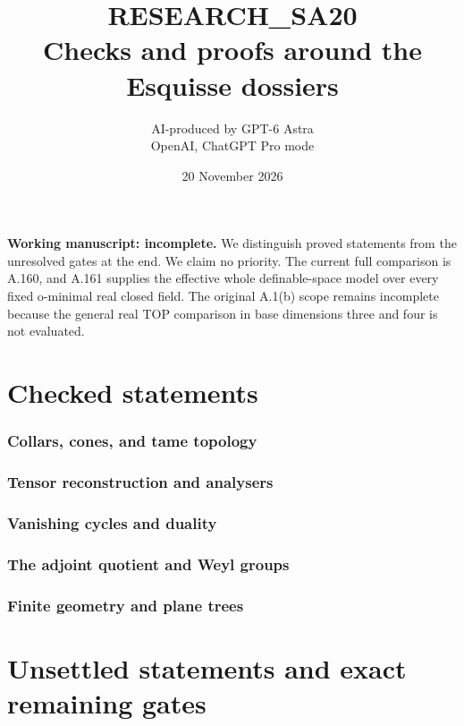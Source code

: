 \documentclass[11pt,a4paper]{article}
\title{RESEARCH\_SA20\\Checks and proofs around the Esquisse dossiers}
\author{AI-produced by GPT-6 Astra\\OpenAI, ChatGPT Pro mode}
\date{20 November 2026}
\begin{document}
\maketitle
\noindent\textbf{Working manuscript: incomplete.} We distinguish proved
statements from the unresolved gates at the end. We claim no priority.
The current full comparison is A.160, and A.161 supplies the effective
whole definable-space model over every fixed o-minimal real closed field.
The original A.1(b) scope remains incomplete because the general real
TOP comparison in base dimensions three and four is not evaluated.
\tableofcontents
\part{Checked statements}
\section{Collars, cones, and tame topology}
\section{Tensor reconstruction and analysers}
\section{Vanishing cycles and duality}
\section{The adjoint quotient and Weyl groups}
\section{Finite geometry and plane trees}
\clearpage
\part*{Unsettled statements and exact remaining gates}


\end{document}
